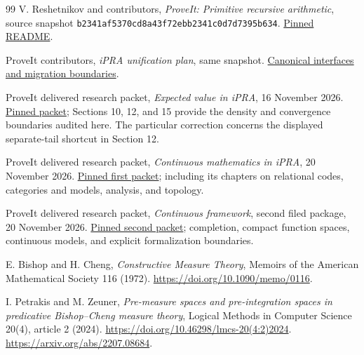 \begin{thebibliography}{99}
V. Reshetnikov and contributors, \emph{ProveIt: Primitive recursive
arithmetic}, source snapshot
\texttt{b2341af5370cd8a43f72ebb2341c0d7d7395b634}.
\href{https://github.com/VladimirReshetnikov/ProveIt/blob/b2341af5370cd8a43f72ebb2341c0d7d7395b634/Logic/PrimitiveRecursiveArithmetic/README.md}{Pinned README}.

ProveIt contributors, \emph{iPRA unification plan}, same snapshot.
\href{https://github.com/VladimirReshetnikov/ProveIt/blob/b2341af5370cd8a43f72ebb2341c0d7d7395b634/Logic/PrimitiveRecursiveArithmetic/UNIFICATION-PLAN.md}{Canonical interfaces and migration boundaries}.

ProveIt delivered research packet,
\emph{Expected value in iPRA}, 16 November 2026.
\href{https://github.com/VladimirReshetnikov/ProveIt/tree/b2341af5370cd8a43f72ebb2341c0d7d7395b634/Logic/PrimitiveRecursiveArithmetic/docs/proofs/probability/expected_value_ipra_2026-11-16}{Pinned packet};
Sections 10, 12, and 15 provide the density and convergence boundaries
audited here. The particular correction concerns the displayed
separate-tail shortcut in Section 12.

ProveIt delivered research packet,
\emph{Continuous mathematics in iPRA}, 20 November 2026.
\href{https://github.com/VladimirReshetnikov/ProveIt/tree/b2341af5370cd8a43f72ebb2341c0d7d7395b634/Logic/PrimitiveRecursiveArithmetic/docs/proofs/foundations/ipra_continuous_framework_2026-11-20}{Pinned first packet}; including its chapters on relational codes,
categories and models, analysis, and topology.

ProveIt delivered research packet,
\emph{Continuous framework}, second filed package, 20 November 2026.
\href{https://github.com/VladimirReshetnikov/ProveIt/tree/b2341af5370cd8a43f72ebb2341c0d7d7395b634/Logic/PrimitiveRecursiveArithmetic/docs/proofs/foundations/ipra_continuous_framework_2026-11-20_2}{Pinned second packet}; completion, compact function spaces,
continuous models, and explicit formalization boundaries.

E. Bishop and H. Cheng, \emph{Constructive Measure Theory},
Memoirs of the American Mathematical Society 116 (1972).
\url{https://doi.org/10.1090/memo/0116}.

I. Petrakis and M. Zeuner,
\emph{Pre-measure spaces and pre-integration spaces in predicative
Bishop--Cheng measure theory}, Logical Methods in Computer Science
20(4), article 2 (2024).
\url{https://doi.org/10.46298/lmcs-20(4:2)2024}.
\url{https://arxiv.org/abs/2207.08684}.


\end{thebibliography}
